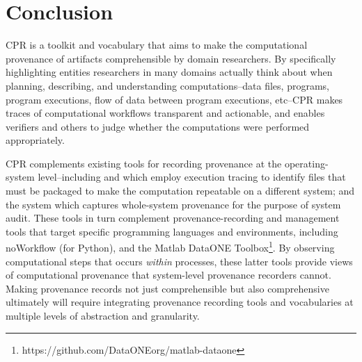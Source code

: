 \section{Conclusion}

CPR is a toolkit and vocabulary that aims to make the computational provenance of artifacts comprehensible by domain researchers. By specifically highlighting entities researchers in many domains actually think about when planning, describing, and understanding computations--data files, programs, program executions, flow of data between program executions, etc--CPR makes traces of computational workflows transparent and actionable, and enables verifiers and others to judge whether the computations were performed appropriately.

CPR complements existing tools for recording provenance at the operating-system level--including  and \cite{that_sciunits_2017} which employ execution tracing to identify files that must be packaged to make the computation repeatable on a different system; and the \cite{pasquier-socc2017} system which captures whole-system provenance for the purpose of system audit. These tools in turn complement provenance-recording and management tools that target specific programming languages and environments, including noWorkflow \cite{pimentel_fine-grained_2016} (for Python), and the Matlab DataONE Toolbox\footnote{https://github.com/DataONEorg/matlab-dataone}. By observing computational steps that occurs \emph{within} processes, these latter tools provide views of computational provenance that system-level provenance recorders cannot.  Making provenance records not just comprehensible but also comprehensive ultimately will require integrating provenance recording tools and vocabularies at multiple levels of abstraction and granularity.